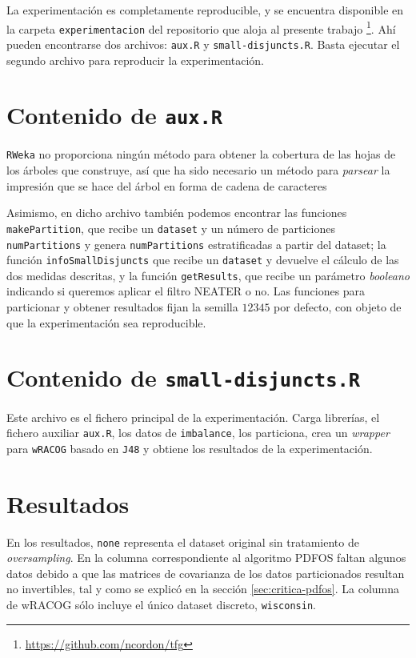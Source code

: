 La experimentación es completamente reproducible, y se encuentra disponible en la carpeta \texttt{experimentacion} del 
repositorio que aloja al presente trabajo \footnote{\url{https://github.com/ncordon/tfg}}.
Ahí pueden encontrarse dos archivos: \texttt{aux.R} y \texttt{small-disjuncts.R}. Basta ejecutar el segundo archivo
para reproducir la experimentación.

\section{Contenido de \texttt{aux.R}}
\texttt{RWeka} no proporciona ningún método para obtener la cobertura de las hojas de los árboles que construye, así que
ha sido necesario un método para \textit{parsear} la impresión que se hace del árbol en forma de cadena de caracteres


Asimismo, en dicho archivo también podemos encontrar las funciones \texttt{makePartition}, que recibe un \texttt{dataset}
y un número de particiones \texttt{numPartitions} y genera \texttt{numPartitions} estratificadas a partir del dataset; la
función \texttt{infoSmallDisjuncts} que recibe un \texttt{dataset} y devuelve el cálculo de las dos medidas descritas, y 
la función \texttt{getResults}, que recibe un parámetro \textit{booleano} indicando si queremos aplicar el filtro NEATER
o no. Las funciones para particionar y obtener resultados fijan la semilla $12345$ por defecto, con objeto de que la 
experimentación sea reproducible.


\section{Contenido de \texttt{small-disjuncts.R}}
Este archivo es el fichero principal de la experimentación. Carga librerías, el fichero auxiliar \texttt{aux.R}, los datos
de \texttt{imbalance}, los particiona, crea un \textit{wrapper} para \texttt{wRACOG} basado en \texttt{J48} y obtiene los 
resultados de la experimentación.

\section{Resultados}
En los resultados, \texttt{none} representa el dataset original sin tratamiento de \textit{oversampling}. En la columna
correspondiente al algoritmo PDFOS faltan algunos datos debido a que las matrices de covarianza de los datos particionados 
resultan no invertibles, tal y como se explicó en la sección \ref{sec:critica-pdfos}. La columna de wRACOG sólo incluye el
único dataset discreto, \texttt{wisconsin}.
